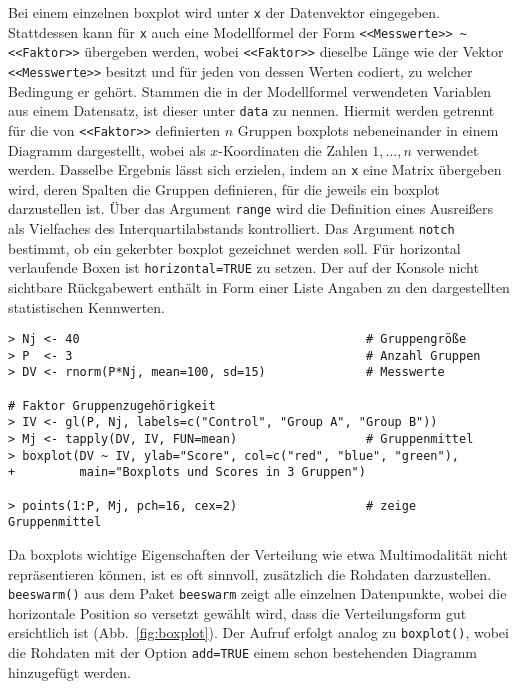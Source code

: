 Bei einem einzelnen boxplot wird unter \lstinline!x! der Datenvektor eingegeben. Stattdessen kann für \lstinline!x! auch eine Modellformel der Form \lstinline!<<Messwerte>> ~ <<Faktor>>! übergeben werden, wobei \lstinline!<<Faktor>>! dieselbe Länge wie der Vektor \lstinline!<<Messwerte>>! besitzt und für jeden von dessen Werten codiert, zu welcher Bedingung er gehört. Stammen die in der Modellformel verwendeten Variablen aus einem Datensatz, ist dieser unter \lstinline!data! zu nennen.  Hiermit werden getrennt für die von \lstinline!<<Faktor>>! definierten $n$ Gruppen boxplots nebeneinander in einem Diagramm dargestellt, wobei als $x$-Koordinaten die Zahlen $1, \ldots, n$ verwendet werden. Dasselbe Ergebnis lässt sich erzielen, indem an \lstinline!x! eine Matrix übergeben wird, deren Spalten die Gruppen definieren, für die jeweils ein boxplot darzustellen ist. Über das Argument \lstinline!range! wird die Definition eines Ausreißers als Vielfaches des Interquartilabstands kontrolliert. Das Argument \lstinline!notch! bestimmt, ob ein gekerbter boxplot gezeichnet werden soll. Für horizontal verlaufende Boxen ist \lstinline!horizontal=TRUE! zu setzen. Der auf der Konsole nicht sichtbare Rückgabewert enthält in Form einer Liste Angaben zu den dargestellten statistischen Kennwerten.
\begin{lstlisting}
> Nj <- 40                                        # Gruppengröße
> P  <- 3                                         # Anzahl Gruppen
> DV <- rnorm(P*Nj, mean=100, sd=15)              # Messwerte

# Faktor Gruppenzugehörigkeit
> IV <- gl(P, Nj, labels=c("Control", "Group A", "Group B"))
> Mj <- tapply(DV, IV, FUN=mean)                  # Gruppenmittel
> boxplot(DV ~ IV, ylab="Score", col=c("red", "blue", "green"),
+         main="Boxplots und Scores in 3 Gruppen")

> points(1:P, Mj, pch=16, cex=2)                  # zeige Gruppenmittel
\end{lstlisting}

Da boxplots wichtige Eigenschaften der Verteilung wie etwa Multimodalität nicht repräsentieren können, ist es oft sinnvoll, zusätzlich die Rohdaten darzustellen. \lstinline!beeswarm()! aus dem Paket \lstinline!beeswarm! \cite{Eklund2016} zeigt alle einzelnen Datenpunkte, wobei die horizontale Position so versetzt gewählt wird, dass die Verteilungsform gut ersichtlich ist (Abb.\ \ref{fig:boxplot}). Der Aufruf erfolgt analog zu \lstinline!boxplot()!, wobei die Rohdaten mit der Option \lstinline!add=TRUE! einem schon bestehenden Diagramm hinzugefügt werden.

